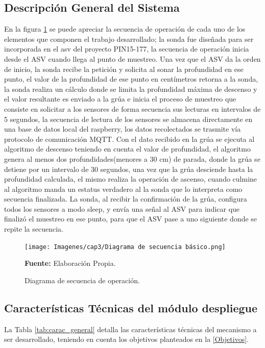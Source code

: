 \subsection[Descripción General del Sistema]{Descripción General del Sistema}
En la figura \ref{fig:diagramaSecuencia} se puede apreciar la secuencia de operaci\'on de cada uno de los elementos que componen el trabajo desarrollado; la sonda fue dise\~nada para ser incorporada en el asv del proyecto PIN15-177, la secuencia de operaci\'on inicia desde el ASV cuando llega al punto de muestreo. 
Una vez que el ASV da la orden de inicio, la sonda recibe la petici\'on y solicita al sonar la profundidad en ese punto, el valor de la profundidad de ese punto en cent\'imetros retorna a la sonda, la sonda realiza un c\'alculo donde se limita la profundidad m\'axima de descenso y el valor resultante es enviado a la gr\'ua e inicia el proceso de muestreo que consiste en solicitar a los sensores de forma secuencia sus lecturas en intervalos de 5 segundos, la secuencia de lectura de los sensores se almacena directamente en una base de datos local del raspberry, los datos recolectados se trasmite v\'ia protocolo de comunicaci\'on MQTT. 
Con el dato recibido en la grúa se ejecuta al algoritmo de descenso teniendo en cuenta el valor de profundidad, el algoritmo genera al menos dos profundidades(menores a 30 cm) de parada, donde la gr\'ua se detiene por un intervalo de 30 segundos, una vez que la gr\'ua desciende hasta la profundidad calculada, el mismo realiza la operaci\'on de ascenso, cuando culmine al algoritmo manda un estatus verdadero al la sonda que lo interpreta como secuencia finalizada.
La sonda, al recibir la confirmaci\'on  de la gr\'ua, configura todos los sensores a modo sleep, y envía una se\~nal al ASV para indicar que finalizó el muestreo en ese punto, para que el ASV pase a uno siguiente donde se repite la secuencia. 

\begin{figure}[H]
    \centering
    \texttt{[image: Imagenes/cap3/Diagrama de secuencia básico.png]}
    \caption {Diagrama de secuencia de operaci\'on.}{\textbf{Fuente:}
    Elaboraci\'on Propia. }
    \label{fig:diagramaSecuencia}
\end{figure}

\subsection[Caracter\'isticas T\'ecnicas del m\'odulo despliegue]{Caracter\'isticas T\'ecnicas del m\'odulo despliegue}
La Tabla \ref{tab:carac_general} detalla las caracter\'isticas t\'ecnicas del mecanismo a ser desarrollado, teniendo en cuenta los objetivos planteados en la  \autoref{Objetivos}.

